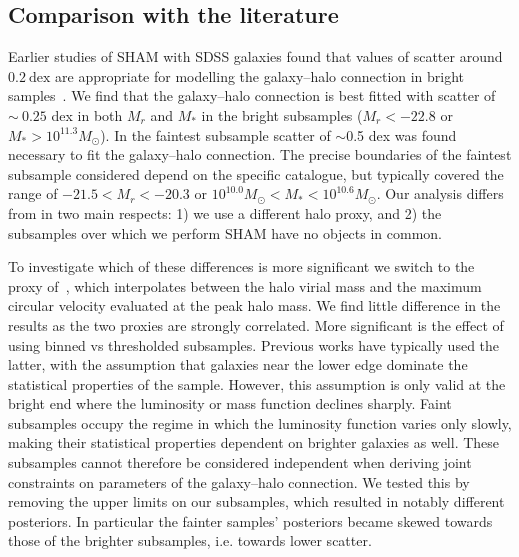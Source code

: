 \documentclass[usenatbib,useAMS]{mnras}
\begin{document}
\subsection{Comparison with the literature}

Earlier studies of \ac{SHAM} with \ac{SDSS} galaxies found that values of scatter around $0.2~\mathrm{dex}$ are appropriate for modelling the galaxy--halo connection in bright samples~\citep{Lehmann, Reddick2013}. We find that the galaxy--halo connection is best fitted with scatter of $\sim~0.25$ dex in both $M_r$ and $M_*$ in the bright subsamples ($M_r < -22.8$ or $M_* > 10^{11.3} M_\odot$). In the faintest subsample scatter of $\sim$0.5 dex was found necessary to fit the galaxy--halo connection. The precise boundaries of the faintest subsample considered depend on the specific catalogue, but typically covered the range of $-21.5 < M_r < -20.3$ or $10^{10.0} M_\odot < M_* < 10^{10.6} M_\odot$. Our analysis differs from \citet{Lehmann} in two main respects: 1) we use a different halo proxy, and 2) the subsamples over which we perform \ac{SHAM} have no objects in common.

To investigate which of these differences is more significant we switch to the proxy of~\citet{Lehmann}, which interpolates between the halo virial mass and the maximum circular velocity evaluated at the peak halo mass.
We find little difference in the results as the two proxies are strongly correlated. More significant is the effect of using binned vs thresholded subsamples. Previous works have typically used the latter, with the assumption that galaxies near the lower edge dominate the statistical properties of the sample. However, this assumption is only valid at the bright end where the luminosity or mass function declines sharply. Faint subsamples occupy the regime in which the luminosity function varies only slowly, making their statistical properties dependent on brighter galaxies as well. These subsamples cannot therefore be considered independent when deriving joint constraints on parameters of the galaxy--halo connection. We tested this by removing the upper limits on our subsamples, which resulted in notably different posteriors. In particular the fainter samples' posteriors became skewed towards those of the brighter subsamples, i.e. towards lower scatter.
\end{document}

